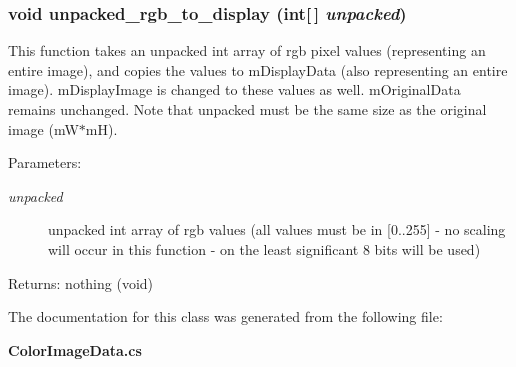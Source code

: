 \subsubsection{\setlength{\rightskip}{0pt plus 5cm}void unpacked\_\-rgb\_\-to\_\-display (int[$\,$] {\em unpacked})}\label{class_c_s_image_viewer_1_1_color_image_data_4d59d33513d7e93b204d290d78c2d6b8}


This function takes an unpacked int array of rgb pixel values (representing an entire image), and copies the values to m\-Display\-Data (also representing an entire image). m\-Display\-Image is changed to these values as well. m\-Original\-Data remains unchanged. Note that unpacked must be the same size as the original image (m\-W$\ast$m\-H). 

\begin{Desc}
\item[Parameters:]
\begin{description}
\item[{\em unpacked}]unpacked int array of rgb values (all values must be in [0..255] - no scaling will occur in this function - on the least significant 8 bits will be used) \end{description}
\end{Desc}
\begin{Desc}
\item[Returns:]nothing (void) \end{Desc}


The documentation for this class was generated from the following file:\begin{CompactItemize}
\item 
{\bf Color\-Image\-Data.cs}\end{CompactItemize}
